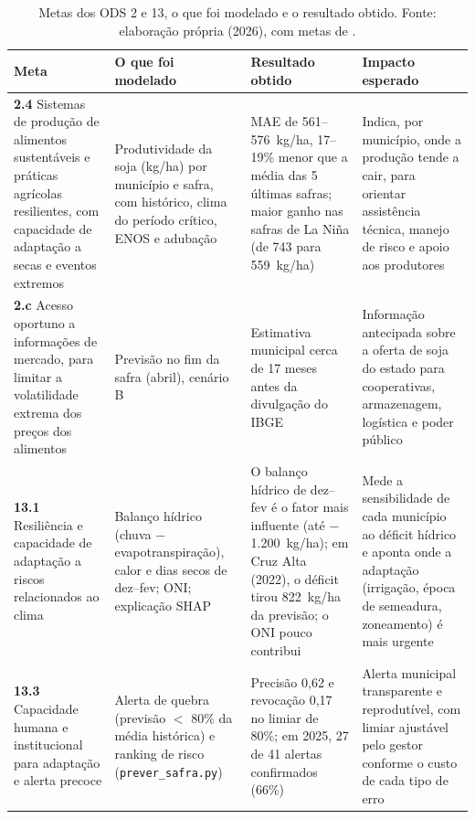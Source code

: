 \documentclass[12pt]{article}
\begin{document}
\begin{table}[ht]
\centering
\caption{Metas dos ODS 2 e 13, o que foi modelado e o resultado obtido. Fonte: elaboração própria (2026), com metas de \cite{onu2015}.}
\label{tab:ods}
\footnotesize
\setlength{\tabcolsep}{4pt}
\begin{tabular}{|>{\raggedright\arraybackslash}p{2.9cm}|>{\raggedright\arraybackslash}p{3.3cm}|>{\raggedright\arraybackslash}p{3.6cm}|>{\raggedright\arraybackslash}p{3.6cm}|}
\hline
\textbf{Meta} & \textbf{O que foi modelado} & \textbf{Resultado obtido} & \textbf{Impacto esperado} \\ \hline
\textbf{2.4} Sistemas de produção de alimentos sustentáveis e práticas agrícolas resilientes, com capacidade de adaptação a secas e eventos extremos & Produtividade da soja (kg/ha) por município e safra, com histórico, clima do período crítico, ENOS e adubação & MAE de 561--576~kg/ha, 17--19\% menor que a média das 5 últimas safras; maior ganho nas safras de La Niña (de 743 para 559~kg/ha) & Indica, por município, onde a produção tende a cair, para orientar assistência técnica, manejo de risco e apoio aos produtores \\ \hline
\textbf{2.c} Acesso oportuno a informações de mercado, para limitar a volatilidade extrema dos preços dos alimentos & Previsão no fim da safra (abril), cenário B & Estimativa municipal cerca de 17 meses antes da divulgação do IBGE & Informação antecipada sobre a oferta de soja do estado para cooperativas, armazenagem, logística e poder público \\ \hline
\textbf{13.1} Resiliência e capacidade de adaptação a riscos relacionados ao clima & Balanço hídrico (chuva $-$ evapotranspiração), calor e dias secos de dez--fev; ONI; explicação SHAP & O balanço hídrico de dez--fev é o fator mais influente (até $-$1.200~kg/ha); em Cruz Alta (2022), o déficit tirou 822~kg/ha da previsão; o ONI pouco contribui & Mede a sensibilidade de cada município ao déficit hídrico e aponta onde a adaptação (irrigação, época de semeadura, zoneamento) é mais urgente \\ \hline
\textbf{13.3} Capacidade humana e institucional para adaptação e alerta precoce & Alerta de quebra (previsão $<$ 80\% da média histórica) e ranking de risco (\texttt{prever\_safra.py}) & Precisão 0,62 e revocação 0,17 no limiar de 80\%; em 2025, 27 de 41 alertas confirmados (66\%) & Alerta municipal transparente e reprodutível, com limiar ajustável pelo gestor conforme o custo de cada tipo de erro \\ \hline
\end{tabular}
\end{table}
\end{document}

